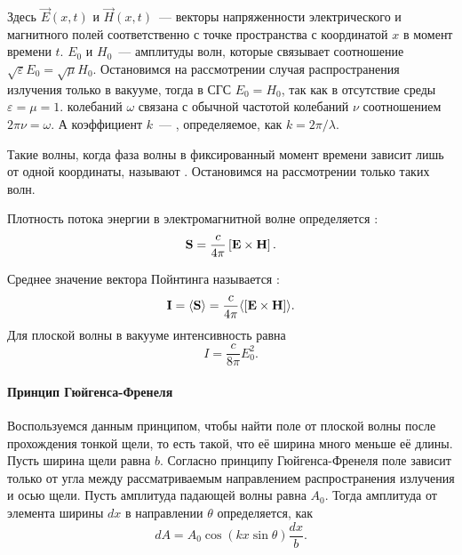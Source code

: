 Здесь $\vec E(x, t)$ и $\vec H (x, t)$~---  векторы напряженности электрического и магнитного полей соответственно с точке пространства с координатой $x$ в момент времени $t$. $E_0$ и $H_0$~--- амплитуды волн, которые связывает соотношение $\sqrt{\varepsilon}E_0 = \sqrt{\mu} H_0$. Остановимся на рассмотрении случая распространения излучения только в вакууме, тогда в СГС $E_0 = H_0$, так как в отсутствие среды $\varepsilon = \mu = 1$.  колебаний $\omega$ связана с обычной частотой колебаний $\nu$ соотношением $2\pi \nu = \omega$. А коэффициент $k$~--- , определяемое, как $k = 2 \pi / \lambda$.

Такие волны, когда фаза волны в фиксированный момент времени зависит лишь от одной координаты, называют . Остановимся на рассмотрении только таких волн.

Плотность потока энергии в электромагнитной волне определяется :
\begin{equation}
	\mathbf{S} = \frac{c}{4\pi} \left[\mathbf{E} \times \mathbf{H}\right].
\end{equation}

Среднее значение вектора Пойнтинга называется :
\begin{equation}
	\mathbf{I} = \langle \mathbf{S}\rangle = \frac{c}{4\pi} \langle \left[\mathbf{E} \times \mathbf{H}\right] \rangle.
\end{equation}
Для плоской волны в вакууме интенсивность равна
\begin{equation}
	I = \frac{c}{8\pi} E_0^2.
\end{equation}

\paragraph{Принцип Гюйгенса-Френеля}

Воспользуемся данным принципом, чтобы найти поле от плоской волны после прохождения тонкой щели, то есть такой, что её ширина много меньше её длины. Пусть ширина щели равна $b$. Согласно принципу Гюйгенса-Френеля поле зависит только от угла между рассматриваемым направлением распространения излучения и осью щели. Пусть амплитуда падающей волны равна $A_0$. Тогда амплитуда от элемента ширины $dx$ в направлении $\theta$ определяется, как
\begin{equation*}
	dA = A_0 \cos (k x \sin \theta) \frac{dx}{b}.
\end{equation*}

